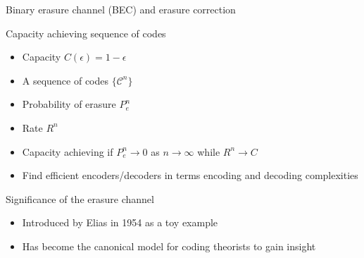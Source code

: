 \begin{frame}{Binary erasure channel (BEC) and erasure correction}
\vspace*{-3mm}
\begin{figure}[t]
\centering
\scalebox{0.55}{}
\end{figure}
\vspace*{-3mm}
\begin{block}{Capacity achieving sequence of codes}
\begin{itemize}
\pause \item Capacity $C(\epsilon) = 1-\epsilon$
\pause  \item A sequence of codes $\{\mathcal{C}^n\}$
  \item Probability of erasure $P_e^n$
  \item Rate $R^n$
  \item Capacity achieving if $P_e^n \rightarrow 0$ as $n \rightarrow \infty$ while $R^n \rightarrow C$
\pause  \item \alert{Find efficient encoders/decoders in terms encoding and decoding complexities}
\end{itemize}
\end{block}
\pause
\begin{block}{Significance of the erasure channel}
\begin{itemize}
  \item Introduced by Elias in 1954 as a toy example
  \item Has become the canonical model for coding theorists to gain insight
\end{itemize}
\end{block}


\end{frame}



